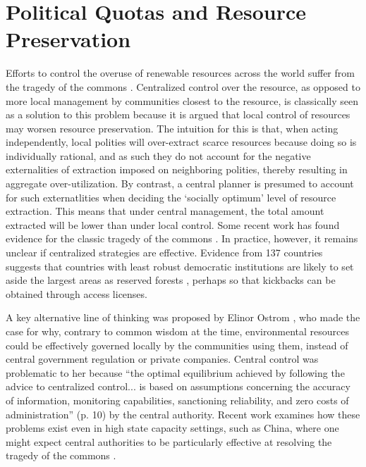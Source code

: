 \documentclass[12pt,reqno]{article}
\begin{document}


\section{Political Quotas and Resource Preservation} %
\label{sec:conceptual_framework}


Efforts to control the overuse of renewable resources across the world suffer from the tragedy of the commons \parencite{hardin1968tragedy}. Centralized control over the resource, as opposed to more local management by communities closest to the resource, is classically seen as a solution to this problem because it is argued that local control of resources may worsen resource preservation. The intuition for this is that, when acting independently, local polities will over-extract scarce resources because doing so is individually rational, and as such they do not account for the negative externalities of extraction imposed on neighboring polities, thereby resulting in aggregate over-utilization. By contrast, a central planner is presumed to account for such externatlities when deciding the `socially optimum' level of resource extraction. This means that under central management, the total amount extracted will be lower than under local control.
Some recent work has found evidence for the classic tragedy of the commons \parencite{lopez1998tragedy}. In practice, however, it remains unclear if centralized strategies are effective. Evidence from 137 countries suggests that countries with least robust democratic institutions are likely to set aside the largest areas as reserved forests \parencite{kashwan2017inequality}, perhaps so that kickbacks can be obtained through access licenses. 


A key alternative line of thinking was proposed by Elinor Ostrom \parencite{ostrom1990governing}, who made the case for why, contrary to common wisdom at the time, environmental resources could be effectively governed locally by the communities using them, instead of central government regulation or private companies. Central control was problematic to her because ``the optimal equilibrium achieved by following the advice to centralized control... is based on assumptions concerning the accuracy of information, monitoring capabilities, sanctioning reliability, and zero costs of administration'' (p. 10) by the central authority. Recent work examines how these problems exist even in high state capacity settings, such as China, where one might expect central authorities to be particularly effective at resolving the tragedy of the commons \parencite{anderson2019non}.  
\end{document}

